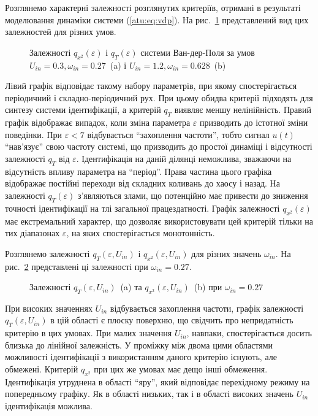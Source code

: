 Розглянемо характерні залежності розглянутих критеріїв,
отримані в результаті моделювання динаміки системи
(\ref{atu:eq:vdp}). На рис.~\ref{atu:f:vdp_q1} представлений вид цих залежностей
для різних умов.


\begin{figure}[ht!]
  \caption{Залежності $ q_{x^2} (\varepsilon) $ і $ q_T (\varepsilon) $ системи Ван-дер-Поля за умов $ U_{in}=0.3, \omega_{in}=0.27$~(a) і $U_{in}=1.2, \omega_{in}=0.628$~(b)}
\label{atu:f:vdp_q1}
\end{figure}

Лівий графік відповідає такому набору параметрів, при якому
спостерігається періодичний і складно-періодичний рух. При цьому
обидва критерії підходять для синтезу системи ідентифікації,
а критерій $ q_T $ виявляє меншу нелінійність. Правий графік відображає
випадок, коли зміна параметра
$ \varepsilon $ призводить до істотної зміни поведінки. При
$ \varepsilon <7 $ відбувається ``захоплення частоти'', тобто
сигнал
$u(t)$ ``нав'язує'' свою частоту системі, що призводить до простої
динаміці і відсутності залежності
$q_T$ від
$\varepsilon$. Ідентифікація на даній ділянці неможлива, зважаючи на
відсутність впливу параметра на ``період''. Права частина цього
графіка відображає постійні переходи від складних коливань
до хаосу і назад. На залежності
$ q_T (\varepsilon) $ з'являються злами, що потенційно має привести
до зниження точності ідентифікації на тлі загальної
працездатності. Графік залежності
$q_{x^2}(\varepsilon) $ має екстремальний характер, що дозволяє
використовувати цей критерій тільки на тих діапазонах
$\varepsilon$, на яких спостерігається монотонність.

Розглянемо залежності
$q_T (\varepsilon, U_{in}) $ і
$q_{x^2}(\varepsilon, U_{in})$ для різних значень
$\omega_{in} $.
На рис.~\ref{atu:f:vdp_q2_027} представлені ці залежності при
$ \omega_{in} = 0.27 $.


\begin{figure}[ht!]
  \caption{Залежності $q_T(\varepsilon,U_{in})$~(a) та $q_{x^2}(\varepsilon,U_{in})$~(b)  при $\omega_{in}=0.27$}
\label{atu:f:vdp_q2_027}
\end{figure}

При високих значеннях
$U_{in} $ відбувається захоплення частоти, графік залежності
$q_T (\varepsilon, U_{in})$ в цій області є плоску поверхню, що свідчить
про непридатність критерію в цих умовах. При малих значення
$U_{in}$, навпаки, спостерігається досить близька до лінійної
залежність. У проміжку між двома цими областями можливості
ідентифікації з використанням даного критерію існують, але
обмежені. Критерій
$q_{x^2}$ при цих же умовах має дещо інші обмеження. Ідентифікація
утруднена в області ``яру'', який відповідає перехідному режиму
на попередньому графіку. Як в області низьких, так і в області
високих значень
$U_{in}$ ідентифікація можлива.

